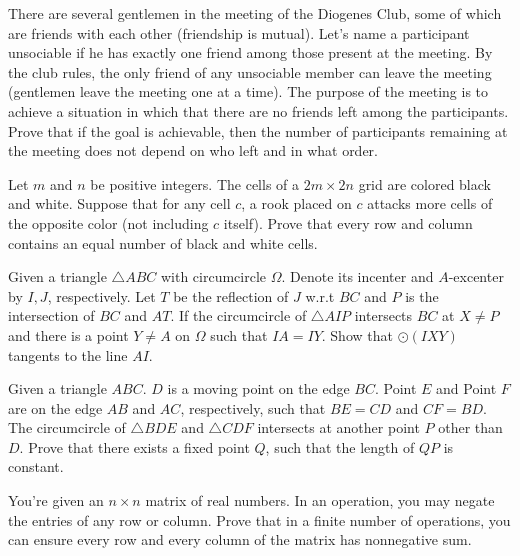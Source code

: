 \documentclass[11pt]{scrartcl}
\begin{document}
\begin{problem}[645068477920006]
There are several gentlemen in the meeting of the Diogenes Club, some of which are friends with each other (friendship is mutual). Let's name a participant unsociable if he has exactly one friend among those present at the meeting. By the club rules, the only friend of any unsociable member can leave the meeting (gentlemen leave the meeting one at a time). The purpose of the meeting is to achieve a situation in which that there are no friends left among the participants. Prove that if the goal is achievable, then the number of participants remaining at the meeting does not depend on who left and in what order.
\end{problem}
\begin{problem}[855628849330783]
  Let $m$ and $n$ be positive integers.
  The cells of a $2m \times 2n$ grid are colored black and white.
  Suppose that for any cell $c$, a rook placed on $c$ attacks
  more cells of the opposite color (not including $c$ itself).
  Prove that every row and column contains
  an equal number of black and white cells.
\end{problem}
\begin{problem}[836909183133087]
Given a triangle $ \triangle{ABC} $ with circumcircle $ \Omega $. Denote its incenter and $ A $-excenter by $ I, J $, respectively. Let $ T $ be the reflection of $ J $ w.r.t $ BC $ and $ P $ is the intersection of $ BC $ and $ AT $. If the circumcircle of $ \triangle{AIP} $ intersects $ BC $ at $ X \neq P $ and there is a point $ Y \neq A $ on $ \Omega $ such that $ IA = IY $. Show that $ \odot\left(IXY\right) $ tangents to the line $ AI $.
\end{problem}
\begin{problem}[117986541208663]
Given a triangle $ABC$. $D$ is a moving point on the edge $BC$. Point $E$ and Point $F$ are on the edge $AB$ and $AC$, respectively, such that $BE=CD$ and $CF=BD$. The circumcircle of $\triangle BDE$ and $\triangle CDF$ intersects at another point $P$ other than $D$. Prove that there exists a fixed point $Q$, such that the length of $QP$ is constant.
\end{problem}
\begin{problem}[329951351081287]
  You're given an $n \times n$ matrix of real numbers.
  In an operation, you may negate the entries of any row or column.
  Prove that in a finite number of operations,
  you can ensure every row and every column of the matrix has nonnegative sum.
\end{problem}
\end{document}
